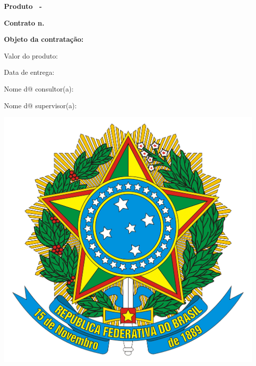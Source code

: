 \addtolength{\topmargin}{2.5cm}
\thispagestyle{empty}
{\color{MidnightBlue}

{\bf \LARGE Produto \ProductNumber\ -\ \ProductTitle}

\hrulefill

\vspace{1cm}

\begin{center}

{\bf \large Contrato n. \ContractNumber}

\vspace{1.5cm}

{\bf \large Objeto da contratação: \ObjetoContratacao}

\end{center}

\vspace{3.2cm}

Valor do produto: \ProductValue

\vspace{1.2cm}

Data de entrega: \DataEntrega

\vspace{1.2cm}

Nome d@ consultor(a): \MyName

\vspace{1.2cm}

Nome d@ supervisor(a): \SupervisorName

}

\vspace{2cm}

\begin{center}
\includegraphics[scale=0.04]{brasao.png} \\
{\bf \small \NomeSecretaria}
\end{center}

\restoregeometry
\newpage
